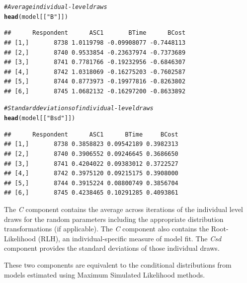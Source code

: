 \documentclass{article}\usepackage[]{graphicx}\usepackage[]{color}
\makeatletter
\newcommand{\hlstr}[1]{\textcolor[rgb]{0.192,0.494,0.8}{#1}}%
\newcommand{\hlcom}[1]{\textcolor[rgb]{0.678,0.584,0.686}{\textit{#1}}}%
\newcommand{\hlstd}[1]{\textcolor[rgb]{0.345,0.345,0.345}{#1}}%
\newcommand{\hlkwd}[1]{\textcolor[rgb]{0.737,0.353,0.396}{\textbf{#1}}}%
\newenvironment{kframe}{%
 \def\at@end@of@kframe{}%
 \ifinner\ifhmode%
  \def\at@end@of@kframe{\end{minipage}}%
  \begin{minipage}{\columnwidth}%
 \fi\fi%
 \def\FrameCommand##1{\hskip\@totalleftmargin \hskip-\fboxsep
 \colorbox{shadecolor}{##1}\hskip-\fboxsep
     \hskip-\linewidth \hskip-\@totalleftmargin \hskip\columnwidth}%
 \MakeFramed {\advance\hsize-\width
   \@totalleftmargin\z@ \linewidth\hsize
   \@setminipage}}%
 {\par\unskip\endMakeFramed%
 \at@end@of@kframe}
\newenvironment{knitrout}{}{} %
\makeatother
\begin{document}
\begin{knitrout}
\color{fgcolor}\begin{kframe}
\begin{alltt}
\hlcom{# Average individual-level draws}
\hlkwd{head}\hlstd{(model[[}\hlstr{"B"}\hlstd{]])}
\end{alltt}
\begin{verbatim}
##      Respondent      ASC1       BTime      BCost
## [1,]       8738 1.0119798 -0.09908077 -0.7448113
## [2,]       8740 0.9533854 -0.23637974 -0.7373689
## [3,]       8741 0.7781766 -0.19232956 -0.6846307
## [4,]       8742 1.0318069 -0.16275203 -0.7602587
## [5,]       8744 0.8773973 -0.19977816 -0.8263802
## [6,]       8745 1.0682132 -0.16297200 -0.8633892
\end{verbatim}
\begin{alltt}
\hlcom{# Standard deviations of individual-level draws}
\hlkwd{head}\hlstd{(model[[}\hlstr{"Bsd"}\hlstd{]])}
\end{alltt}
\begin{verbatim}
##      Respondent      ASC1      BTime     BCost
## [1,]       8738 0.3858823 0.09542189 0.3982313
## [2,]       8740 0.3906552 0.09246645 0.3686650
## [3,]       8741 0.4204022 0.09383012 0.3722527
## [4,]       8742 0.3975120 0.09215175 0.3908000
## [5,]       8744 0.3915224 0.08800749 0.3856704
## [6,]       8745 0.4238465 0.10291285 0.4093861
\end{verbatim}
\end{kframe}
\end{knitrout}

The \emph{C} component contains the average across iterations of the individual level draws for the random parameters including the appropriate distribution transformations (if applicable). The \emph{C} component also contains the Root-Likelihood (RLH), an individual-specific measure of model fit. The \emph{Csd} component provides the standard deviations of those individual draws.

These two components are equivalent to the conditional distributions from models estimated using Maximum Simulated Likelihood methods.
\end{document}
